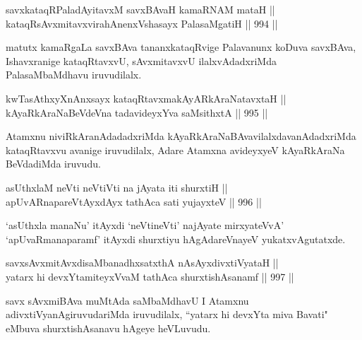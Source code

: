 \begin{shl}
\footnotemark[2]savxkataqRPaladAyitavxM savxBAvaH kamaRNAM mataH || \\
kataqRsAvxmitavxvirahAnenxVshasayx PalasaMgatiH \hfill || 994 ||  
\end{shl}

\begin{artha}
matutx kamaRgaLa savxBAva tananxkataqRvige Palavanunx koDuva savxBAva, Ishavxranige kataqRtavxvU, sAvxmitavxvU ilalxvAdadxriMda PalasaMbaMdhavu iruvudilalx.
\end{artha}


\begin{shl}
kwTasAthxyXnAnxsayx kataqRtavxmakAyARkAraNatavxtaH || \\
kAyaRkAraNaBeVdeVna tadavideyxYva saMsithxtA \hfill || 995 ||  
\end{shl}

\begin{artha}
Atamxnu niviRkAranAdadadxriMda kAyaRkAraNaBAvavilalxdavanAdadx\-riMda kataqRtavxvu avanige iruvudilalx, Adare Atamxna avideyxyeV kAyaRkAraNa BeVdadiMda iruvudu.
\end{artha}


\begin{shl}
asUthxlaM neVti neVtiVti na jAyata iti shurxtiH || \\
apUvARnapareVtAyxdAyx tathAca sati yujayxteV \hfill || 996 ||  
\end{shl}

\begin{artha}
`asUthxla manaNu' itAyxdi `neVtineVti' najAyate mirxyateVvA' `apUvaRmanaparamf' itAyxdi shurxtiyu hAgAdareVnayeV yukatxvAgutatxde.
\end{artha}

\begin{shl}
savxsAvxmitAvxdisaMbanadhxsatxthA nAsAyxdivxtiVyataH || \\
yatarx hi devxYtamiteyxVvaM tathAca shurxtishAsanamf \hfill || 997 ||  
\end{shl}

\begin{artha}
savx sAvxmiBAva muMtAda saMbaMdhavU  I Atamxnu adivxtiVyanAgiruvudariMda iruvudilalx, ``yatarx hi devxYta miva Bavati" eMbuva shurxtishAsanavu hAgeye heVLuvudu.
\end{artha}

